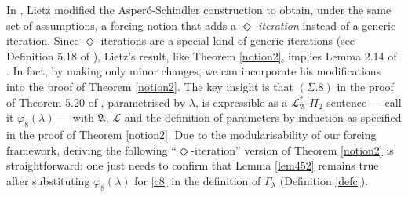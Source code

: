 \documentclass[12pt, twoside]{memoir}
\numberwithin{equation}{section}
\theoremstyle{definition}
\theoremstyle{remark}
\theoremstyle{definition}
\theoremstyle{definition}
\theoremstyle{definition}
\theoremstyle{remark}
\begin{document}
In \cite{lietz}, Lietz modified the Asper\'{o}-Schindler construction to obtain, under the same set of assumptions, a forcing notion that adds a $\Diamond$\emph{-iteration} instead of a generic iteration. Since $\Diamond$-iterations are a special kind of generic iterations (see Definition 5.18 of \cite{lietz}), Lietz's result, like Theorem \ref{notion2}, implies Lemma 2.14 of \cite{schindler}. In fact, by making only minor changes, we can incorporate his modifications into the proof of Theorem \ref{notion2}. The key insight is that $(\Sigma.8)$ in the proof of Theorem 5.20 of \cite{lietz}, parametrised by $\lambda$, is expressible as a $\mathcal{L}^*_{\mathfrak{A}}$-$\Pi_2$ sentence --- call it $\varphi_8(\lambda)$ --- with $\mathfrak{A}$, $\mathcal{L}$ and the definition of parameters by induction as specified in the proof of Theorem \ref{notion2}. Due to the modularisability of our forcing framework, deriving the following ``$\Diamond$-iteration'' version of Theorem \ref{notion2} is straightforward: one just needs to confirm that Lemma \ref{lem452} remains true after substituting $\varphi_8(\lambda)$ for \ref{c8} in the definition of $\Gamma_{\lambda}$ (Definition \ref{defc}).
\end{document}
